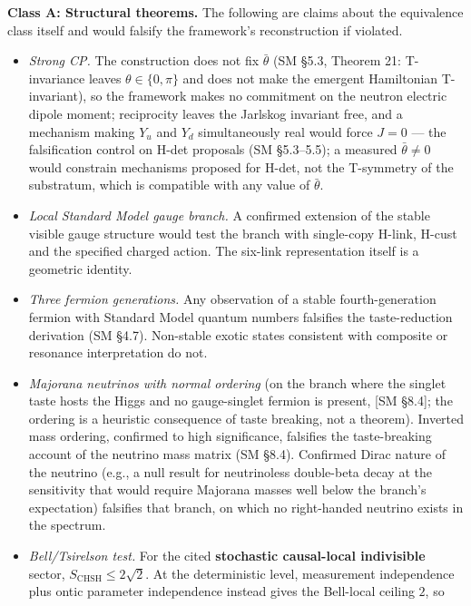 \documentclass[
]{article}
\providecommand{\tightlist}{%
  \setlength{\itemsep}{0pt}\setlength{\parskip}{0pt}}
\begin{document}
\textbf{Class A: Structural theorems.} The following are claims about
the equivalence class itself and would falsify the framework's
reconstruction if violated.

\begin{itemize}
\tightlist
\item
  \emph{Strong CP.} The construction does not fix \(\bar\theta\) (SM
  §5.3, Theorem 21: T-invariance leaves \(\theta\in\{0,\pi\}\) and does
  not make the emergent Hamiltonian T-invariant), so the framework makes
  no commitment on the neutron electric dipole moment; reciprocity
  leaves the Jarlskog invariant free, and a mechanism making \(Y_u\) and
  \(Y_d\) simultaneously real would force \(J=0\) --- the falsification
  control on H-det proposals (SM §5.3--5.5); a measured
  \(\bar\theta\neq0\) would constrain mechanisms proposed for H-det, not
  the T-symmetry of the substratum, which is compatible with any value
  of \(\bar\theta\).
\item
  \emph{Local Standard Model gauge branch.} A confirmed extension of the
  stable visible gauge structure would test the branch with single-copy
  H-link, H-cust and the specified charged action. The six-link
  representation itself is a geometric identity.
\item
  \emph{Three fermion generations.} Any observation of a stable
  fourth-generation fermion with Standard Model quantum numbers
  falsifies the taste-reduction derivation (SM §4.7). Non-stable exotic
  states consistent with composite or resonance interpretation do not.
\item
  \emph{Majorana neutrinos with normal ordering} (on the branch where
  the singlet taste hosts the Higgs and no gauge-singlet fermion is
  present, {[}SM §8.4{]}; the ordering is a heuristic consequence of
  taste breaking, not a theorem). Inverted mass ordering, confirmed to
  high significance, falsifies the taste-breaking account of the
  neutrino mass matrix (SM §8.4). Confirmed Dirac nature of the neutrino
  (e.g., a null result for neutrinoless double-beta decay at the
  sensitivity that would require Majorana masses well below the branch's
  expectation) falsifies that branch, on which no right-handed neutrino
  exists in the spectrum.
\item
  \emph{Bell/Tsirelson test.} For the cited \textbf{stochastic
  causal-local indivisible} sector, \(S_{\mathrm{CHSH}}\le 2\sqrt{2}\).
  At the deterministic level, measurement independence plus ontic
  parameter independence instead gives the Bell-local ceiling \(2\), so

\end{itemize}
\end{document}
